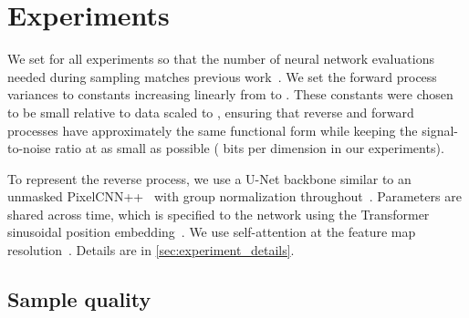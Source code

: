 \documentclass{article}
\begin{document}
\section{Experiments}
\label{sec:experiments}

We set  for all experiments so that the number of neural network evaluations needed during sampling matches previous work~\citep{sohl2015deep,song2019generative}. We set the forward process variances to constants increasing linearly from  to . These constants were chosen to be small relative to data scaled to , ensuring that reverse and forward processes have approximately the same functional form while keeping the signal-to-noise ratio at  as small as possible ( bits per dimension in our experiments).

To represent the reverse process, we use a U-Net backbone similar to an unmasked \mbox{PixelCNN++}~\citep{salimans2017pixelcnn++,ronneberger2015unet} with group normalization throughout~\citep{wu2018group}. Parameters are shared across time, which is specified to the network using the Transformer sinusoidal position embedding~\citep{vaswani2017attention}. We use self-attention at the  feature map resolution~\citep{wang2018non,vaswani2017attention}. Details are in \cref{sec:experiment_details}.


\subsection{Sample quality}
\end{document}
